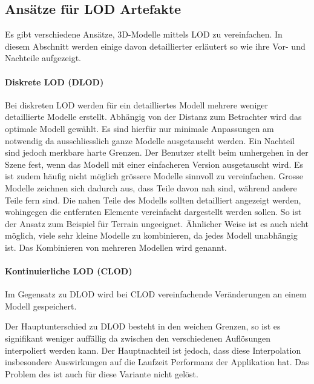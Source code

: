 \subsection{Ansätze für LOD Artefakte}
\label{chap:differentLodApproaches}
Es gibt verschiedene Ansätze, 3D-Modelle mittels LOD zu vereinfachen. In diesem Abschnitt werden einige davon detaillierter erläutert so wie ihre Vor- und Nachteile aufgezeigt.

\paragraph{Diskrete LOD (DLOD)}
Bei diskreten LOD werden für ein detailliertes Modell mehrere weniger detaillierte Modelle erstellt.
Abhängig von der Distanz zum Betrachter wird das optimale Modell gewählt. Es sind hierfür nur minimale Anpassungen am  notwendig da ausschliesslich ganze Modelle ausgetauscht werden.
Ein Nachteil sind jedoch merkbare harte Grenzen. Der Benutzer stellt beim umhergehen in der Szene fest, wenn das Modell mit einer einfacheren Version ausgetauscht wird.
Es ist zudem häufig nicht möglich grössere Modelle sinnvoll zu vereinfachen. Grosse Modelle zeichnen sich dadurch aus, dass Teile davon nah sind, während andere Teile fern sind. Die nahen Teile des Modells sollten detailliert angezeigt werden, wohingegen die entfernten Elemente vereinfacht dargestellt werden sollen. So ist der Ansatz zum Beispiel für Terrain ungeeignet. Ähnlicher Weise ist es auch nicht möglich, viele sehr kleine Modelle zu kombinieren, da jedes Modell unabhängig ist. Das Kombinieren von mehreren Modellen wird  genannt.

\paragraph{Kontinuierliche LOD (CLOD)}
Im Gegensatz zu DLOD wird bei CLOD vereinfachende Veränderungen an einem Modell gespeichert.

Der Hauptunterschied zu DLOD besteht in den weichen Grenzen, so ist es signifikant weniger auffällig da zwischen den verschiedenen Auflösungen interpoliert werden kann.
Der Hauptnachteil ist jedoch, dass diese Interpolation insbesondere Auswirkungen auf die Laufzeit Performanz der Applikation hat.
Das Problem des  ist auch für diese Variante nicht gelöst.

